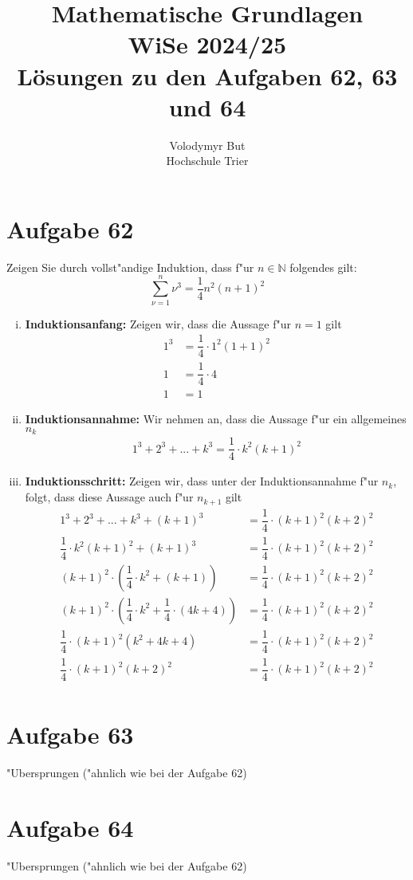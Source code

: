 \documentclass[10pt, oneside]{article}
\title{Mathematische Grundlagen\\[10pt]\Large{WiSe 2024/25}\\[15pt]\Large{L{\"o}sungen zu den Aufgaben 62, 63 und 64}}
\author{Volodymyr But\\[10pt]Hochschule Trier}
\date{}
\begin{document}
\maketitle
\vspace{25px}

\section{Aufgabe 62}

Zeigen Sie durch vollst"andige Induktion, dass f"ur $n \in \mathbb{N}$ folgendes gilt:
\begin{equation*}
    \sum_{\nu = 1}^n\nu^3 = \dfrac{1}{4}n^2(n + 1)^2
\end{equation*}
\begin{enumerate}[i)]
    \item \textbf{Induktionsanfang:} Zeigen wir, dass die Aussage f"ur $n = 1$ gilt
        \begin{align*}
            1^3 &= \dfrac{1}{4} \cdot 1^2(1 + 1)^2 \\[5pt]
            1 &= \dfrac{1}{4} \cdot 4 \\[5pt]
            1 &= 1
        \end{align*}
    \item \textbf{Induktionsannahme:} Wir nehmen an, dass die Aussage f"ur ein allgemeines $n_k$
        \begin{align*}
            1^3 + 2^3 + ... + k^3 = \dfrac{1}{4} \cdot k^2(k + 1)^2
        \end{align*}
    \item \textbf{Induktionsschritt:} Zeigen wir, dass unter der
        Induktionsannahme f"ur $n_k$, folgt, dass diese Aussage auch f"ur $n_{k
        + 1}$ gilt
        \begin{align*}
            1^3 + 2^3 + ... + k^3 + (k + 1)^3 &= \dfrac{1}{4} \cdot (k + 1)^2(k + 2)^2 \\[5pt]
            \dfrac{1}{4} \cdot k^2(k + 1)^2 + (k + 1)^3 &= \dfrac{1}{4} \cdot (k + 1)^2(k + 2)^2 \\[5pt]
            (k + 1)^2 \cdot \left(\dfrac{1}{4} \cdot k^2 + (k + 1)\right) &= \dfrac{1}{4} \cdot (k + 1)^2(k + 2)^2 \\[5pt]
            (k + 1)^2 \cdot \left(\dfrac{1}{4} \cdot k^2 + \dfrac{1}{4} \cdot (4k + 4)\right) &= \dfrac{1}{4} \cdot (k + 1)^2(k + 2)^2 \\[5pt]
            \dfrac{1}{4} \cdot (k + 1)^2 (k^2 + 4k + 4) &= \dfrac{1}{4} \cdot (k + 1)^2(k + 2)^2 \\[5pt]
            \dfrac{1}{4} \cdot (k + 1)^2 (k + 2)^2 &= \dfrac{1}{4} \cdot (k + 1)^2(k + 2)^2 \\[5pt]
        \end{align*}
\end{enumerate}

\section{Aufgabe 63}

"Ubersprungen ("ahnlich wie bei der Aufgabe 62)

\section{Aufgabe 64}

"Ubersprungen ("ahnlich wie bei der Aufgabe 62)
\end{document}
